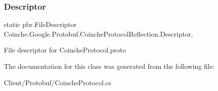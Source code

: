 \subsubsection{\texorpdfstring{Descriptor}{Descriptor}}
{\footnotesize\ttfamily static pbr.\+File\+Descriptor Coinche.\+Google.\+Protobuf.\+Coinche\+Protocol\+Reflection.\+Descriptor\hspace{0.3cm}{\ttfamily [static]}, {\ttfamily [get]}}



File descriptor for Coinche\+Protocol.\+proto



The documentation for this class was generated from the following file\+:\begin{DoxyCompactItemize}
\item 
Client/\+Protobuf/Coinche\+Protocol.\+cs\end{DoxyCompactItemize}
